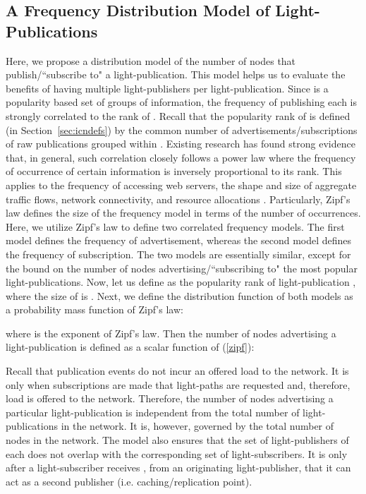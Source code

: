 \documentclass[journal]{IEEEtran}
\begin{document}
\subsection{A Frequency Distribution Model of Light-Publications}\label{sec:zipf}
Here, we propose a distribution model of the number of nodes that publish/``subscribe to" a light-publication. This model helps us to evaluate the benefits of having multiple light-publishers per light-publication. Since  is a popularity based set of groups of information, the frequency of publishing each  is strongly correlated to the rank of . Recall that the popularity rank of  is defined (in Section~\ref{sec:icndefs}) by the common number of advertisements/subscriptions of raw publications grouped within . Existing research has found strong evidence that, in general, such correlation closely follows a power law where the frequency of occurrence of certain information is inversely proportional to its rank. This applies to the frequency of accessing web servers, the shape and size of aggregate traffic flows, network connectivity, and resource allocations \cite{shi2:Zipf, cav:rwa, nai:rwa,car:ICnet, shi:Zipf, kot:Zipf,bre:Zipf}. 
Particularly, Zipf's law defines the size of the frequency model in terms of the number of occurrences. Here, we utilize Zipf's law to define two correlated frequency models. The first model defines the frequency of advertisement, whereas the second model defines the frequency of subscription. The two models are essentially similar, except for the bound on the number of nodes advertising/``subscribing to" the most popular light-publications.
Now, let us define  as the popularity rank of light-publication , where the size of  is . Next, we define the distribution function of both models as a probability mass function of Zipf's law:

where  is the exponent of Zipf's law. Then the number of nodes advertising a light-publication  is defined as a scalar function of (\ref{zipf}):
 
Recall that publication events do not incur an offered load to the network. It is only when subscriptions are made that light-paths are requested and, therefore, load is offered to the network.
Therefore, the number of nodes advertising a particular light-publication is independent from the total number of light-publications in the network. It is, however, governed by the total number of nodes in the network. The model also ensures that the set of light-publishers of each  does not overlap with the corresponding set of light-subscribers. It is only after a light-subscriber receives , from an originating light-publisher, that it can act as a second publisher (i.e. caching/replication point).
\end{document}
